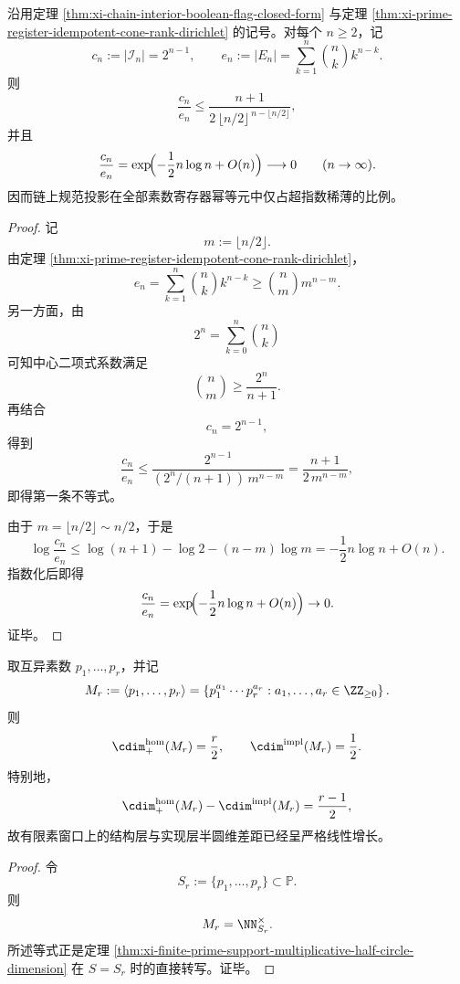 \begin{corollary}[规范投影骨架在全部素数寄存器幂等元中的超指数稀薄性]\label{cor:xi-monotone-idempotent-skeleton-superexponential-sparsity}
沿用定理 \ref{thm:xi-chain-interior-boolean-flag-closed-form} 与定理 \ref{thm:xi-prime-register-idempotent-cone-rank-dirichlet} 的记号。对每个 \(n\ge 2\)，记
\[
c_n:=|\mathcal I_n|=2^{n-1},
\qquad
e_n:=|E_n|=\sum_{k=1}^{n}\binom{n}{k}k^{n-k}.
\]
则
\[
\frac{c_n}{e_n}
\le
\frac{n+1}{2\,\lfloor n/2\rfloor^{\,n-\lfloor n/2\rfloor}},
\]
并且
\[
\frac{c_n}{e_n}
=
\exp\!\Bigl(-\frac12 n\log n+O(n)\Bigr)
\longrightarrow 0
\qquad (n\to\infty).
\]
因而链上规范投影在全部素数寄存器幂等元中仅占超指数稀薄的比例。
\end{corollary}
\begin{proof}
记
\[
m:=\lfloor n/2\rfloor.
\]
由定理 \ref{thm:xi-prime-register-idempotent-cone-rank-dirichlet}，
\[
e_n=\sum_{k=1}^{n}\binom{n}{k}k^{n-k}
\ge
\binom{n}{m}m^{n-m}.
\]
另一方面，由
\[
2^n=\sum_{k=0}^{n}\binom{n}{k}
\]
可知中心二项式系数满足
\[
\binom{n}{m}\ge \frac{2^n}{n+1}.
\]
再结合
\[
c_n=2^{n-1},
\]
得到
\[
\frac{c_n}{e_n}
\le
\frac{2^{n-1}}{(2^n/(n+1))\,m^{n-m}}
=
\frac{n+1}{2\,m^{n-m}},
\]
即得第一条不等式。

由于 \(m=\lfloor n/2\rfloor\sim n/2\)，于是
\[
\log\frac{c_n}{e_n}
\le
\log(n+1)-\log 2-(n-m)\log m
=
-\frac12 n\log n+O(n).
\]
指数化后即得
\[
\frac{c_n}{e_n}
=
\exp\!\Bigl(-\frac12 n\log n+O(n)\Bigr)\to 0.
\]
证毕。
\end{proof}

\begin{theorem}[有限素窗口同态半圆维的严格线性差距]\label{thm:xi-finite-prime-window-halfcircle-linear-gap}
取互异素数 \(p_1,\dots,p_r\)，并记
\[
M_r:=\langle p_1,\dots,p_r\rangle
=
\left\{p_1^{a_1}\cdots p_r^{a_r}: a_1,\dots,a_r\in\ZZ_{\ge 0}\right\}.
\]
则
\[
\cdim^{\mathrm{hom}}_{+}(M_r)=\frac{r}{2},
\qquad
\cdim^{\mathrm{impl}}(M_r)=\frac12.
\]
特别地，
\[
\cdim^{\mathrm{hom}}_{+}(M_r)-\cdim^{\mathrm{impl}}(M_r)=\frac{r-1}{2},
\]
故有限素窗口上的结构层与实现层半圆维差距已经呈严格线性增长。
\end{theorem}
\begin{proof}
令
\[
S_r:=\{p_1,\dots,p_r\}\subset\mathbb P.
\]
则
\[
M_r=\NN_{S_r}^\times.
\]
所述等式正是定理 \ref{thm:xi-finite-prime-support-multiplicative-half-circle-dimension} 在 \(S=S_r\) 时的直接转写。证毕。
\end{proof}

